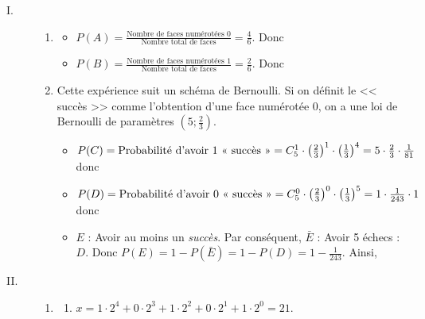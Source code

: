 	\begin{description}
		\item[I. ]
			\begin{enumerate}
				\item \begin{itemize}
							\item {}
								$P(A) = \frac{\text{Nombre de faces num\'erot\'ees }0}{\text{Nombre total de faces}} = \frac{4}{6}$.
								Donc 
							\item {}
								$P(B) = \frac{\text{Nombre de faces num\'erot\'ees }1}{\text{Nombre total de faces}} = \frac{2}{6}$.
								Donc 
						\end{itemize}
				\item Cette exp\'erience suit un sch\'ema de Bernoulli.
						Si on d\'efinit le << succ\`es >> comme l'obtention d'une face num\'erot\'ee $0$,
						on a une loi de Bernoulli de param\`etres $(5 ; \frac{2}{3})$.
						\begin{itemize}
							\item {}
								$
									P(C) = \text{Probabilit\'e d'avoir 1 << succ\`es >>}
										= C_{5}^{1} \cdot \left( \frac{2}{3} \right)^1 \cdot \left( \frac{1}{3} \right)^4
									 	= 5 \cdot \frac{2}{3} \cdot \frac{1}{81}
								$
								donc 
							\item {}
								$
									P(D) = \text{Probabilit\'e d'avoir 0 << succ\`es >>}
										= C_{5}^{0} \cdot \left( \frac{2}{3} \right)^0 \cdot \left( \frac{1}{3} \right)^5
									 	= 1 \cdot \frac{1}{243} \cdot 1
								$
								donc 
							\item {}
								$E$ : Avoir au moins un \emph{succ\`es}.
								Par cons\'equent, $\bar{E}$ : Avoir 5 \'echecs : $D$.
								Donc $P(E) = 1 - P(\bar{E}) = 1 - P(D) = 1 - \frac{1}{243}$.
								Ainsi, 
						\end{itemize}
			\end{enumerate}
		\item[II. ]
			\begin{enumerate}
				\item \begin{enumerate}
								\item {}
								$x = 1\cdot 2^4 + 0 \cdot 2^3 + 1 \cdot 2^2 + 0 \cdot 2^1 + 1 \cdot 2^0 = 21$.

\end{enumerate}
\end{enumerate}
\end{description}
